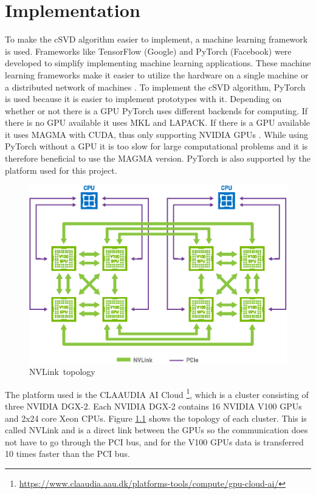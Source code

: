 \chapter{Implementation}

To make the cSVD algorithm easier to implement, a machine learning framework is used. Frameworks like TensorFlow (Google) \cite{tensorflow:about} and PyTorch (Facebook) \cite{pytorch:docs} were developed to simplify implementing machine learning applications. These machine learning frameworks make it easier to utilize the hardware on a single machine or a distributed network of machines \cite{pytorch:docs}. To implement the cSVD algorithm, PyTorch is used because it is easier to implement prototypes with it.  Depending on whether or not there is a GPU PyTorch uses different backends for computing. If there is no GPU available it uses MKL and LAPACK. If there is a GPU available it uses MAGMA with CUDA, thus only supporting NVIDIA GPUs \cite{pytorch:docs}. While using PyTorch without a GPU it is too slow for large computational problems and it is therefore beneficial to use the MAGMA version. PyTorch is also supported by the platform used for this project.



\begin{figure}[H]
  \centering
  \includegraphics[scale=0.6]{Figures/nvlink.eps}
  \caption[]{NVLink\protect\footnotemark\ topology}
  \label{fig:nvlink}
\end{figure}
  

The platform used is the CLAAUDIA AI Cloud \footnote{\url{https://www.claaudia.aau.dk/platforms-tools/compute/gpu-cloud-ai/}}, which is a cluster consisting of three NVIDIA DGX-2. Each NVIDIA DGX-2 contains 16 NVIDIA V100 GPUs and 2x24 core Xeon CPUs. Figure \ref{fig:nvlink} shows the topology of each cluster. This is called NVLink and is a direct link between the GPUs so the communication does not have to go through the PCI bus, and for the V100 GPUs data is transferred 10 times faster than the PCI bus.

